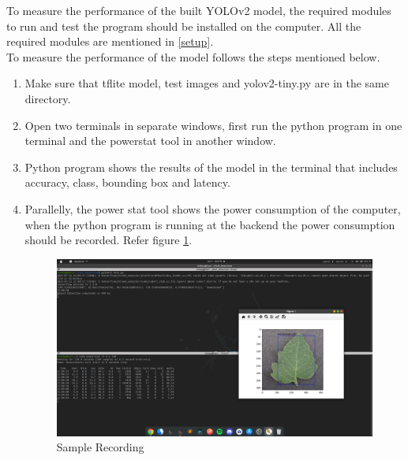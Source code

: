 \documentclass[a4paper,12pt,oneside]{book}
\begin{document}
To measure the performance of the built YOLOv2 model, the required modules to run and test the program should be installed on the computer. All the required modules are mentioned in \autoref{setup}.\\
To measure the performance of the model follows the steps mentioned below.
\begin{enumerate}
    \item Make sure that tflite model, test images and yolov2-tiny.py are in the same directory.
    \item Open two terminals in separate windows, first run the python program in one terminal and the powerstat tool in another window.
    \item Python program shows the results of the model in the terminal that includes accuracy, class, bounding box and latency.
    \item Parallelly, the power stat tool shows the power consumption of the computer, when the python program is running at the backend the power consumption should be recorded. Refer figure \ref{figure:record-simple}.
    \begin{figure}[h!]
        \centering
        \includegraphics[width=\linewidth]{images/record-perform.png}
        \caption{Sample Recording}
        \label{figure:record-simple}
    \end{figure}
\end{enumerate}
\end{document}
